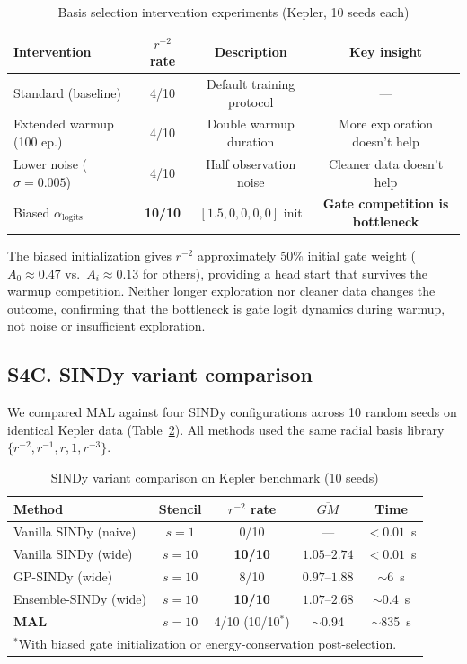 \documentclass[aps,pre,reprint,superscriptaddress]{revtex4-2}
\begin{document}
\begin{table}[!ht]
\centering
\caption{Basis selection intervention experiments (Kepler, 10 seeds each)}
\label{tab:interventions-si}
\small
\begin{tabular}{lccc}
\hline
Intervention & $r^{-2}$ rate & Description & Key insight \\
\hline
Standard (baseline) & 4/10 & Default training protocol & --- \\
Extended warmup (100 ep.) & 4/10 & Double warmup duration & More exploration doesn't help \\
Lower noise ($\sigma = 0.005$) & 4/10 & Half observation noise & Cleaner data doesn't help \\
Biased $\alpha_{\text{logits}}$ & \textbf{10/10} & $[1.5, 0, 0, 0, 0]$ init & \textbf{Gate competition is bottleneck} \\
\hline
\end{tabular}
\end{table}

The biased initialization gives $r^{-2}$ approximately 50\% initial gate weight ($A_0 \approx 0.47$ vs.\ $A_i \approx 0.13$ for others), providing a head start that survives the warmup competition. Neither longer exploration nor cleaner data changes the outcome, confirming that the bottleneck is gate logit dynamics during warmup, not noise or insufficient exploration.

\subsection{S4C. SINDy variant comparison}
We compared MAL against four SINDy configurations across 10 random seeds on identical Kepler data (Table~\ref{tab:sindy-comparison-si}). All methods used the same radial basis library $\{r^{-2}, r^{-1}, r, 1, r^{-3}\}$.

\begin{table}[!ht]
\centering
\caption{SINDy variant comparison on Kepler benchmark (10 seeds)}
\label{tab:sindy-comparison-si}
\small
\begin{tabular}{lcccc}
\hline
Method & Stencil & $r^{-2}$ rate & $\overline{GM}$ & Time \\
\hline
Vanilla SINDy (naive) & $s=1$ & 0/10 & --- & $<0.01$~s \\
Vanilla SINDy (wide) & $s=10$ & \textbf{10/10} & $1.05 \text{--} 2.74$ & $<0.01$~s \\
GP-SINDy (wide) & $s=10$ & 8/10 & $0.97 \text{--} 1.88$ & $\sim$6~s \\
Ensemble-SINDy (wide) & $s=10$ & \textbf{10/10} & $1.07 \text{--} 2.68$ & $\sim$0.4~s \\
\textbf{MAL} & $s=10$ & 4/10 (10/10$^*$) & $\sim$0.94 & $\sim$835~s \\
\hline
\multicolumn{5}{l}{\small $^*$With biased gate initialization or energy-conservation post-selection.} \\
\end{tabular}
\end{table}
\end{document}
